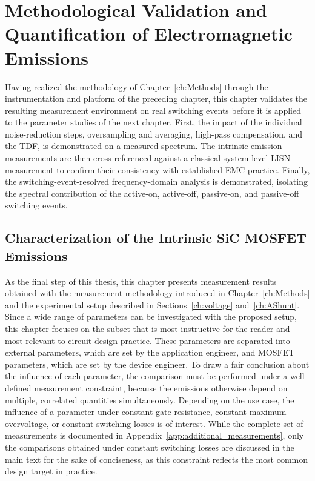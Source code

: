 
\chapter{Methodological Validation and Quantification of Electromagnetic Emissions}
\label{ch:Validation}

Having realized the methodology of Chapter~\ref{ch:Methods} through the instrumentation and platform of the preceding chapter, this chapter validates the resulting measurement environment on real switching events before it is applied to the parameter studies of the next chapter.
First, the impact of the individual noise-reduction steps, oversampling and averaging, high-pass compensation, and the TDF, is demonstrated on a measured spectrum.
The intrinsic emission measurements are then cross-referenced against a classical system-level LISN measurement to confirm their consistency with established EMC practice.
Finally, the switching-event-resolved frequency-domain analysis is demonstrated, isolating the spectral contribution of the active-on, active-off, passive-on, and passive-off switching events.





\section{Characterization of the Intrinsic SiC MOSFET Emissions}
\label{sec:Results}

As the final step of this thesis, this chapter presents measurement results obtained with the measurement methodology introduced in Chapter~\ref{ch:Methods} and the experimental setup described in Sections~\ref{ch:voltage} and~\ref{ch:AShunt}.
Since a wide range of parameters can be investigated with the proposed setup, this chapter focuses on the subset that is most instructive for the reader and most relevant to circuit design practice.
These parameters are separated into external parameters, which are set by the application engineer, and MOSFET parameters, which are set by the device engineer.
To draw a fair conclusion about the influence of each parameter, the comparison must be performed under a well-defined measurement constraint, because the emissions otherwise depend on multiple, correlated quantities simultaneously.
Depending on the use case, the influence of a parameter under constant gate resistance, constant maximum overvoltage, or constant switching losses is of interest.
While the complete set of measurements is documented in Appendix~\ref{app:additional_measurements}, only the comparisons obtained under constant switching losses are discussed in the main text for the sake of conciseness, as this constraint reflects the most common design target in practice.

